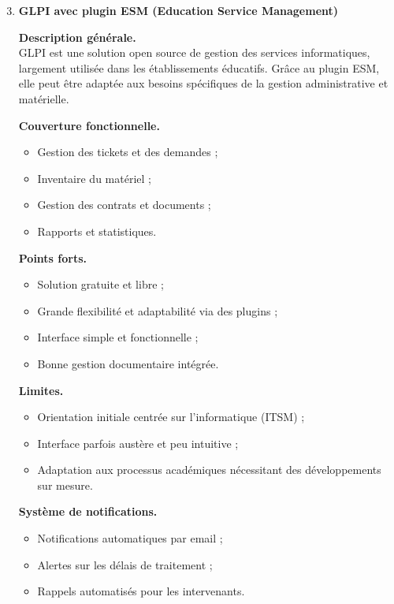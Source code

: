 \begin{enumerate}[label=\alph*)]
\setcounter{enumi}{2}  %

\item \textbf{GLPI avec plugin ESM (Education Service Management)}

\textbf{Description générale.} \\
GLPI est une solution open source de gestion des services informatiques, largement utilisée dans les établissements éducatifs. Grâce au plugin ESM, elle peut être adaptée aux besoins spécifiques de la gestion administrative et matérielle.

\textbf{Couverture fonctionnelle.}
\begin{itemize}
\item Gestion des tickets et des demandes ;
\item Inventaire du matériel ;
\item Gestion des contrats et documents ;
\item Rapports et statistiques.
\end{itemize}

\textbf{Points forts.}
\begin{itemize}
\item Solution gratuite et libre ;
\item Grande flexibilité et adaptabilité via des plugins ;
\item Interface simple et fonctionnelle ;
\item Bonne gestion documentaire intégrée.
\end{itemize}

\textbf{Limites.}
\begin{itemize}
\item Orientation initiale centrée sur l'informatique (ITSM) ;
\item Interface parfois austère et peu intuitive ;
\item Adaptation aux processus académiques nécessitant des développements sur mesure.
\end{itemize}

\textbf{Système de notifications.}
\begin{itemize}
\item Notifications automatiques par email ;
\item Alertes sur les délais de traitement ;
\item Rappels automatisés pour les intervenants.
\end{itemize}


\end{enumerate}
